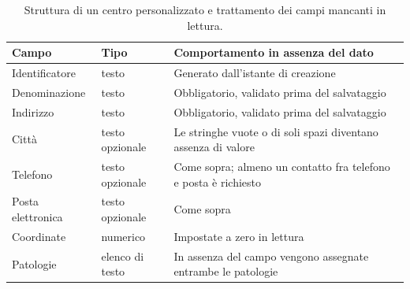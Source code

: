 \begin{table}[H]
\footnotesize
\begin{tabularx}{\textwidth}{@{}P{2.7cm} P{2.5cm} L@{}}
\toprule
\textbf{Campo} & \textbf{Tipo} & \textbf{Comportamento in assenza del dato} \tabularnewline
\midrule
Identificatore & testo & Generato dall'istante di creazione \tabularnewline
Denominazione & testo & Obbligatorio, validato prima del salvataggio \tabularnewline
Indirizzo & testo & Obbligatorio, validato prima del salvataggio \tabularnewline
Città & testo opzionale & Le stringhe vuote o di soli spazi diventano assenza di valore \tabularnewline
Telefono & testo opzionale & Come sopra; almeno un contatto fra telefono e posta è richiesto \tabularnewline
Posta elettronica & testo opzionale & Come sopra \tabularnewline
Coordinate & numerico & Impostate a zero in lettura \tabularnewline
Patologie & elenco di testo & In assenza del campo vengono assegnate entrambe le patologie \tabularnewline
\bottomrule
\end{tabularx}
\caption{Struttura di un centro personalizzato e trattamento dei campi mancanti in lettura.}
\label{tab:modello-custom}
\end{table}




